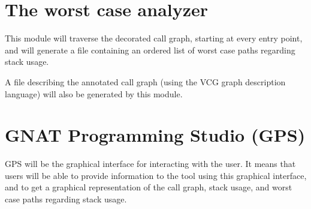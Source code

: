 \section{The worst case analyzer}

This module will traverse the decorated call graph, starting at every
entry point, and will generate a file containing an ordered list of
worst case paths regarding stack usage.

A file describing the annotated call graph (using the VCG
 graph description language) will also be generated by
this module.

\section{GNAT Programming Studio (GPS)}

GPS will be the graphical interface for interacting with the user. It
means that users will be able to provide information to the tool using
this graphical interface, and to get a graphical representation of the
call graph, stack usage, and worst case paths regarding stack usage.
